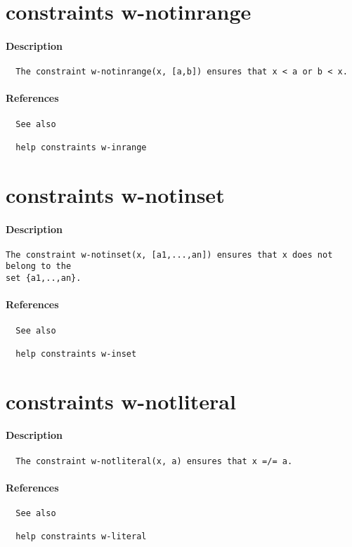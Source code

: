 \section{constraints w-notinrange}
\paragraph{Description}
{\footnotesize
\begin{verbatim}
  The constraint w-notinrange(x, [a,b]) ensures that x < a or b < x.
\end{verbatim}
}
\paragraph{References}
{\footnotesize
\begin{verbatim}
  See also

  help constraints w-inrange
\end{verbatim}
}
\section{constraints w-notinset}
\paragraph{Description}
{\footnotesize
\begin{verbatim}
The constraint w-notinset(x, [a1,...,an]) ensures that x does not belong to the
set {a1,..,an}.
\end{verbatim}
}
\paragraph{References}
{\footnotesize
\begin{verbatim}
  See also

  help constraints w-inset
\end{verbatim}
}
\section{constraints w-notliteral}
\paragraph{Description}
{\footnotesize
\begin{verbatim}
  The constraint w-notliteral(x, a) ensures that x =/= a.
\end{verbatim}
}
\paragraph{References}
{\footnotesize
\begin{verbatim}
  See also

  help constraints w-literal
\end{verbatim}
}
